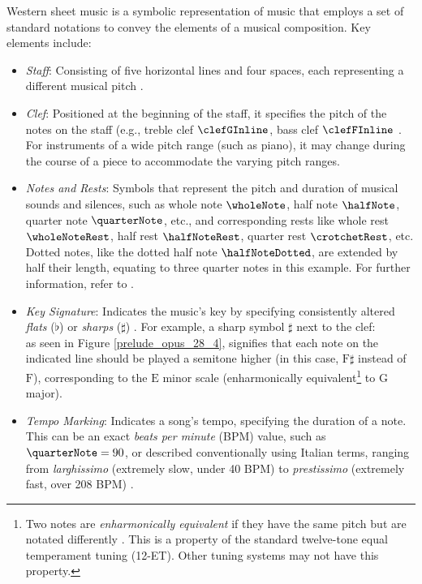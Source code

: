 Western sheet music is a symbolic representation of music that employs a set of standard notations to convey the elements of a musical composition. Key elements include:
\begin{itemize}
   \item \emph{Staff}: Consisting of five horizontal lines and four spaces, each representing a different musical pitch \cite[p.~27]{Read1969}.
   \item \emph{Clef}: Positioned at the beginning of the staff, it specifies the pitch of the notes on the staff (e.g., treble clef $\clefGInline$, bass clef $\clefFInline$ \cite[p.~51--55]{Read1969}. For instruments of a wide pitch range (such as piano), it may change during the course of a piece to accommodate the varying pitch ranges.
   \item \emph{Notes and Rests}: Symbols that represent the pitch and duration of musical sounds and silences, such as whole note $\wholeNote$, half note $\halfNote$, quarter note $\quarterNote$, etc., and corresponding rests like whole rest $\wholeNoteRest$, half rest $\halfNoteRest$, quarter rest $\crotchetRest$, etc. Dotted notes, like the dotted half note $\halfNoteDotted$, are extended by half their length, equating to three quarter notes in this example. For further information, refer to \cite[p.~64--65, 96, 103, 113--114]{Read1969}.
   \item \emph{Key Signature}: Indicates the music's key by specifying consistently altered \emph{flats} ($\flat$) or \emph{sharps} ($\sharp$) \cite[p.~135--136]{Read1969}. For example, a sharp symbol $\sharp$ next to the clef: \[\] as seen in Figure \ref{prelude_opus_28_4}, signifies that each note on the indicated line should be played a semitone higher (in this case, $\textrm{F}\sharp$ instead of $\textrm{F}$), corresponding to the $\textrm{E}$ minor scale (enharmonically equivalent\footnote{Two notes are \emph{enharmonically equivalent} if they have the same pitch but are notated differently \cite[p.~10]{Kostka1994}. This is a property of the standard twelve-tone equal temperament tuning (12-ET). Other tuning systems may not have this property.} to $\textrm{G}$ major).
   \item \emph{Tempo Marking}: Indicates a song's tempo, specifying the duration of a note. This can be an exact \emph{beats per minute} (BPM) value, such as $\quarterNote = 90$, or described conventionally using Italian terms, ranging from \emph{larghissimo} (extremely slow, under 40 BPM) to \emph{prestissimo} (extremely fast, over 208 BPM) \cite[p.~276--277]{Read1969}.

\end{itemize}
